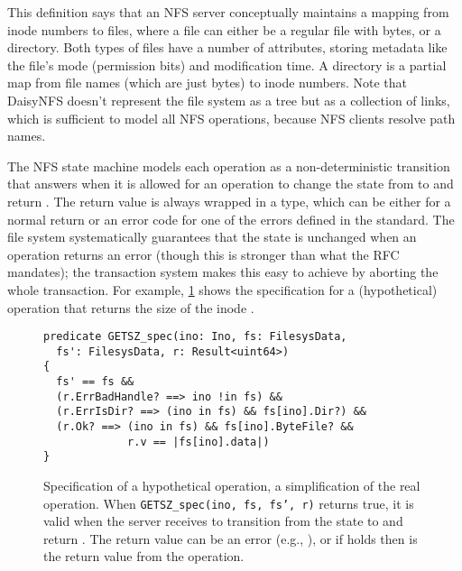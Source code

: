 This definition says that an NFS server conceptually maintains a mapping from
inode numbers to files, where a file can either be a regular file with
bytes, or a directory. Both types of files have a number of attributes, storing
metadata like the file's mode (permission bits) and modification time. A
directory is a partial map from file names
(which are just bytes) to inode numbers. Note that DaisyNFS doesn't
represent the file system as a tree but as a collection of
links, which is sufficient to model all NFS operations, because
NFS clients resolve path names.


The NFS state machine models each operation as a non-deterministic transition
that answers when it is allowed for an operation to change the state from
 to  and return . The return value is always wrapped in a
 type, which can be either  for a normal return or an error
code for one of the errors defined in the standard. The file system systematically guarantees
that the state is unchanged when an operation returns an error (though this is
stronger than what the RFC mandates); the transaction system makes this easy to
achieve by aborting the whole transaction. For example,
\cref{fig:getsz} shows the
specification for a (hypothetical)  operation that returns the size of
the inode .

\begin{figure}[ht]
\begin{verbatim}
predicate GETSZ_spec(ino: Ino, fs: FilesysData,
  fs': FilesysData, r: Result<uint64>)
{
  fs' == fs &&
  (r.ErrBadHandle? ==> ino !in fs) &&
  (r.ErrIsDir? ==> (ino in fs) && fs[ino].Dir?) &&
  (r.Ok? ==> (ino in fs) && fs[ino].ByteFile? &&
             r.v == |fs[ino].data|)
}
\end{verbatim}
  \caption[Transition-system specification for a hypothetical  operation.]%
  {Specification of a hypothetical  operation, a simplification
  of the real  operation. When \texttt{GETSZ\_spec(ino, fs, fs', r)}
  returns true, it is valid when the server receives  to transition from
the state  to  and return . The return value can be an
error (e.g., ), or if  holds then  is the
 return value from the operation.}
\label{fig:getsz}
\end{figure}

